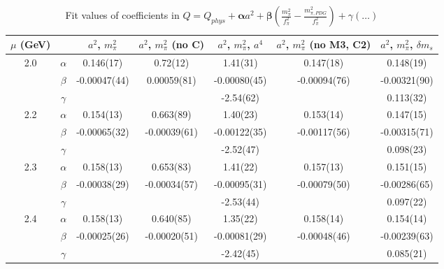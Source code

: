 \documentclass[12pt]{extarticle}
\begin{document}
\begin{table}[h!]
\begin{center}
\begin{tabular}{|c c|c|c|c|c|c|}
\hline
$\mu$ (GeV) &  & $a^2$, $m_\pi^2$& $a^2$, $m_\pi^2$ (no C)& $a^2$, $m_\pi^2$, $a^4$& $a^2$, $m_\pi^2$ (no M3, C2)& $a^2$, $m_\pi^2$, $\delta m_s$\\
\hline
\multirow{3}{0.5in}{2.0} & $\alpha$ & 0.146(17)& 0.72(12)& 1.41(31)& 0.147(18)& 0.148(19)\\
 & $\beta$ & -0.00047(44)& 0.00059(81)& -0.00080(45)& -0.00094(76)& -0.00321(90)\\
 & $\gamma$ &  &  & -2.54(62)&  & 0.113(32)\\
\hline
\multirow{3}{0.5in}{2.2} & $\alpha$ & 0.154(13)& 0.663(89)& 1.40(23)& 0.153(14)& 0.147(15)\\
 & $\beta$ & -0.00065(32)& -0.00039(61)& -0.00122(35)& -0.00117(56)& -0.00315(71)\\
 & $\gamma$ &  &  & -2.52(47)&  & 0.098(23)\\
\hline
\multirow{3}{0.5in}{2.3} & $\alpha$ & 0.158(13)& 0.653(83)& 1.41(22)& 0.157(13)& 0.151(15)\\
 & $\beta$ & -0.00038(29)& -0.00034(57)& -0.00095(31)& -0.00079(50)& -0.00286(65)\\
 & $\gamma$ &  &  & -2.53(44)&  & 0.097(22)\\
\hline
\multirow{3}{0.5in}{2.4} & $\alpha$ & 0.158(13)& 0.640(85)& 1.35(22)& 0.158(14)& 0.154(14)\\
 & $\beta$ & -0.00025(26)& -0.00020(51)& -0.00081(29)& -0.00048(46)& -0.00239(63)\\
 & $\gamma$ &  &  & -2.42(45)&  & 0.085(21)\\
\hline
\end{tabular}
\caption{Fit values of coefficients in $Q = Q_{phys} + \mathbf{\alpha} a^2 + \mathbf{\beta}\left(\frac{m_\pi^2}{f_\pi^2}-\frac{m_{\pi,PDG}^2}{f_\pi^2}\right) + \gamma(\ldots)$}
\end{center}
\end{table}




















\clearpage
\end{document}
